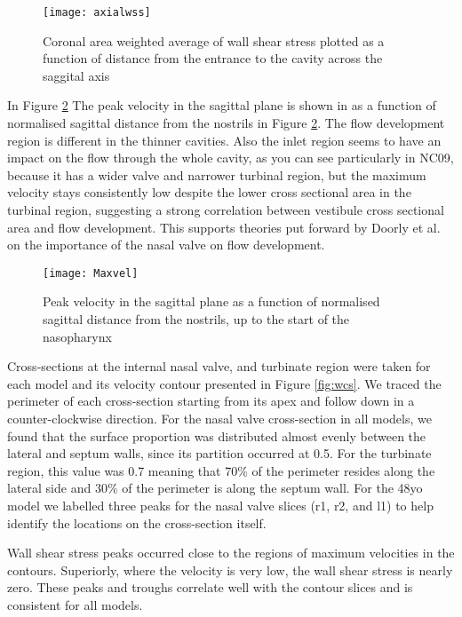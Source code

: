 \begin{figure} 
  \texttt{[image: axialwss]}
  \caption{Coronal area weighted average of wall shear stress plotted as a function of distance from the entrance to the cavity across the saggital axis}
  \label{fig:wax}
\end{figure}

In Figure \ref{fig:peakvel} The peak velocity in the sagittal plane is shown in as a function of normalised sagittal distance from the nostrils in Figure \ref{fig:peakvel}. The flow development region is different in the thinner cavities. Also the inlet region seems to have an impact on the flow through the whole cavity, as you can see particularly in NC09, because it has a wider valve and narrower turbinal region, but the maximum velocity stays consistently low despite the lower cross sectional area in the turbinal region, suggesting a strong correlation between vestibule cross sectional area and flow development. This supports theories put forward by Doorly et al. \cite{Doorly2008c} on the importance of the nasal valve on flow development.

\begin{figure} 
  \texttt{[image: Maxvel]}
  \caption{Peak velocity in the sagittal plane as a function of normalised sagittal distance from the nostrils, up to the start of the nasopharynx}
  \label{fig:peakvel}
\end{figure}

Cross-sections at the internal nasal valve, and turbinate region were taken for each model and its velocity contour presented in Figure \ref{fig:wcs}. We traced the perimeter of each cross-section starting from its apex and follow down in a counter-clockwise direction. For the nasal valve cross-section in all models, we found that the surface proportion was distributed almost evenly between the lateral and septum walls, since its partition occurred at 0.5. For the turbinate region, this value was 0.7 meaning that 70\% of the perimeter resides along the lateral side and 30\% of the perimeter is along the septum wall. For the 48yo model we labelled three peaks for the nasal valve slices (r1, r2, and l1) to help identify the locations on the cross-section itself. 

Wall shear stress peaks occurred close to the regions of maximum velocities in the contours. Superiorly, where the velocity is very low, the wall shear stress is nearly zero. These peaks and troughs correlate well with the contour slices and is consistent for all models.

